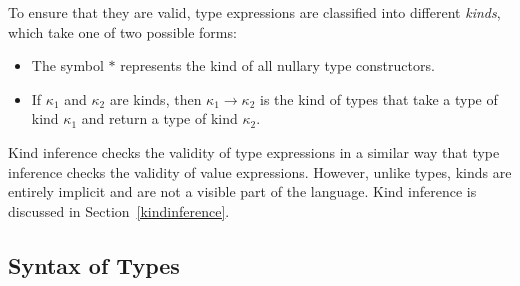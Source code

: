 To ensure that they are valid, type expressions are classified
into different {\em kinds},  which take one of two possible
forms:\nopagebreak[4]
\begin{itemize}

\item The symbol $\ast$ represents the kind of all nullary type
constructors.

\item If $\kappa_1$ and $\kappa_2$ are kinds, then $\kappa_1\rightarrow\kappa_2$
is the kind of types that take a type of kind $\kappa_1$ and return
a type of kind $\kappa_2$.
\end{itemize}
Kind inference checks the validity of type expressions 
in a similar way that type inference checks the validity of value expressions.  
However, unlike types, kinds are entirely
implicit and are not a visible part of the language.  Kind inference is discussed
in Section~\ref{kindinference}.

\subsection{Syntax of Types}
\label{type-syntax}
\label{types}

